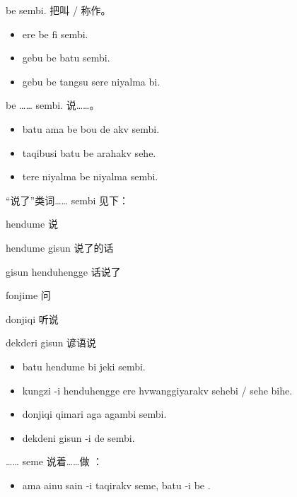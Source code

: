 \begin{des}
    \item[\A be \B sembi.] 把\A 叫 / 称作\B 。
        \begin{itemize}
            \item ere be fi sembi.
            \item gebu be batu sembi.
            \item gebu be tangsu sere niyalma  bi.
        \end{itemize}
    \item[\A \B be …… sembi.] \A 说\B ……。
        \begin{itemize}
            \item batu ama be bou de akv sembi.
            \item taqibusi batu be  arahakv sehe.
            \item {} tere niyalma be niyalma  sembi.
        \end{itemize}
    \item[“说了”类词…… sembi]见下：
        \begin{des}
            \item[hendume] 说
            \item[hendume gisun] 说了的话
            \item[gisun henduhengge] 话说了
            \item[fonjime] 问
            \item[donjiqi] 听说
            \item[dekderi gisun] 谚语说   
        \end{des}
        \begin{itemize}
            \item batu hendume bi  jeki sembi.
            \item kungzi -i henduhengge ere  hvwanggiyarakv sehebi / sehe bihe.
            \item donjiqi qimari aga agambi sembi.
            \item dekdeni gisun  -i  de     sembi.
        \end{itemize}
    \item[\A …… seme \V\ftn{主要}] \A 说着……做\V{} ：
        \begin{itemize}
            \item ama ainu sain -i taqirakv seme, batu -i  be .

\end{itemize}
\end{des}
